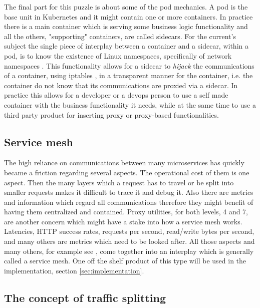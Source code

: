 \documentclass[conference]{IEEEtran}
\begin{document}
    The final part for this puzzle is about some of the pod mechanics. A pod is the base unit in Kubernetes and it might contain one or more containers. In practice there is a main container which is serving some business logic functionality and all the others, "supporting" containers, are called sidecars. For the current's subject the single piece of interplay between a container and a sidecar, within a pod, is to know the existence of Linux namespaces, specifically of network namespaces \cite{b12}. This functionality allows for a sidecar to \textit{hijack} the communications of a container, using iptables \cite{b13}, in a transparent manner for the container, i.e. the container do not know that its communications are proxied via a sidecar. In practice this allows for a developer or a devops person to use a self made container with the business functionality it needs, while at the same time to use a third party product for inserting proxy or proxy-based functionalities.

\subsection{Service mesh}

    The high reliance on communications between many microservices has quickly became a friction regarding several aspects. The operational cost of them is one aspect. Then the many layers which a request has to travel or be split into smaller requests makes it difficult to trace it and debug it. Also there are metrics and information which regard all communications therefore they might benefit of having them centralized and contained. Proxy utilities, for both levels, 4 and 7, are another concern which might have a stake into how a service mesh works. Latencies, HTTP success rates, requests per second, read/write bytes per second, and many others are metrics which need to be looked after. All those aspects and many others, for example see \cite{b15}, come together into an interplay which is generally called a service mesh. One off the shelf product of this type will be used in the implementation, section \ref{sec:implementation}.

\subsection{The concept of traffic splitting}
\end{document}
